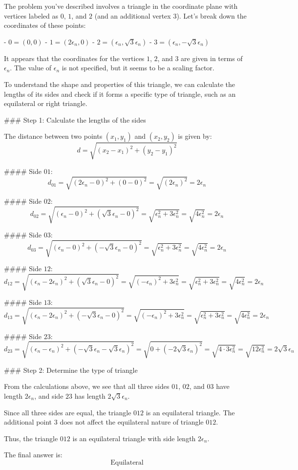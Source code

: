 The problem you've described involves a triangle in the coordinate plane with vertices labeled as \(0\), \(1\), and \(2\) (and an additional vertex \(3\)). Let's break down the coordinates of these points:

- \(0 = (0, 0)\)
- \(1 = (2\epsilon_n, 0)\)
- \(2 = (\epsilon_n, \sqrt{3}\epsilon_n)\)
- \(3 = (\epsilon_n, -\sqrt{3}\epsilon_n)\)

It appears that the coordinates for the vertices \(1\), \(2\), and \(3\) are given in terms of \(\epsilon_n\). The value of \(\epsilon_n\) is not specified, but it seems to be a scaling factor.

To understand the shape and properties of this triangle, we can calculate the lengths of its sides and check if it forms a specific type of triangle, such as an equilateral or right triangle.

### Step 1: Calculate the lengths of the sides

The distance between two points \((x_1, y_1)\) and \((x_2, y_2)\) is given by:
\[ d = \sqrt{(x_2 - x_1)^2 + (y_2 - y_1)^2} \]

#### Side \(01\):
\[ d_{01} = \sqrt{(2\epsilon_n - 0)^2 + (0 - 0)^2} = \sqrt{(2\epsilon_n)^2} = 2\epsilon_n \]

#### Side \(02\):
\[ d_{02} = \sqrt{(\epsilon_n - 0)^2 + (\sqrt{3}\epsilon_n - 0)^2} = \sqrt{\epsilon_n^2 + 3\epsilon_n^2} = \sqrt{4\epsilon_n^2} = 2\epsilon_n \]

#### Side \(03\):
\[ d_{03} = \sqrt{(\epsilon_n - 0)^2 + (-\sqrt{3}\epsilon_n - 0)^2} = \sqrt{\epsilon_n^2 + 3\epsilon_n^2} = \sqrt{4\epsilon_n^2} = 2\epsilon_n \]

#### Side \(12\):
\[ d_{12} = \sqrt{(\epsilon_n - 2\epsilon_n)^2 + (\sqrt{3}\epsilon_n - 0)^2} = \sqrt{(-\epsilon_n)^2 + 3\epsilon_n^2} = \sqrt{\epsilon_n^2 + 3\epsilon_n^2} = \sqrt{4\epsilon_n^2} = 2\epsilon_n \]

#### Side \(13\):
\[ d_{13} = \sqrt{(\epsilon_n - 2\epsilon_n)^2 + (-\sqrt{3}\epsilon_n - 0)^2} = \sqrt{(-\epsilon_n)^2 + 3\epsilon_n^2} = \sqrt{\epsilon_n^2 + 3\epsilon_n^2} = \sqrt{4\epsilon_n^2} = 2\epsilon_n \]

#### Side \(23\):
\[ d_{23} = \sqrt{(\epsilon_n - \epsilon_n)^2 + (-\sqrt{3}\epsilon_n - \sqrt{3}\epsilon_n)^2} = \sqrt{0 + (-2\sqrt{3}\epsilon_n)^2} = \sqrt{4 \cdot 3 \epsilon_n^2} = \sqrt{12\epsilon_n^2} = 2\sqrt{3}\epsilon_n \]

### Step 2: Determine the type of triangle

From the calculations above, we see that all three sides \(01\), \(02\), and \(03\) have length \(2\epsilon_n\), and side \(23\) has length \(2\sqrt{3}\epsilon_n\).

Since all three sides are equal, the triangle \(012\) is an equilateral triangle. The additional point \(3\) does not affect the equilateral nature of triangle \(012\).

Thus, the triangle \(012\) is an equilateral triangle with side length \(2\epsilon_n\).

The final answer is:
\[
\boxed{\text{Equilateral}}
\]